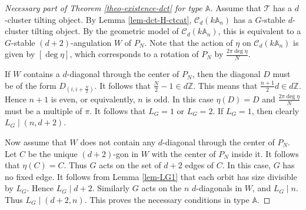 \documentclass[12pt]{article}
\theoremstyle{plain}
\theoremstyle{definition}
\newcommand{\T}{\mathcal{T}}
\begin{document}
 


\begin{proof}[Necessary part of Theorem \ref{theo-existence-dct} for type $\mathbb{A}$]
Assume that $\T$ has a $d$-cluster tilting object. By Lemma
\ref{lem-dct-H-ctcat}, $\mathcal{C}_d(k\mathbb{A}_n)$ has a $G$-stable
$d$-cluster tilting object. By the geometric model of
$\mathcal{C}_d(k\mathbb{A}_n)$, this is equivalent to a \(G\)-stable
\((d+2)\)-angulation \(W\) of \(P_N\). Note that the action of \(\eta\) on
\(\mathcal{C}_d(k\mathbb{A}_n)\) is given by \([\deg\eta]\), which corresponds
to a rotation of \(P_N\) by \(\frac{2\pi\deg\eta}{N}\).

If $W$ contains a $d$-diagonal through the center of $P_N$, then the diagonal $D$ must be of the form $D_{(i,i+\frac{N}{2})}$. It follows that 
\(\frac{N}{2}-1\in d\mathbb{Z}\). 
This means that 
\(\frac{n+1}{2}d\in d\mathbb{Z}\). 
Hence $n+1$ is even, or equivalently, $n$ is odd. In this case  $\eta(D)=D$ and $\frac{2\pi\deg\eta}{N}$ must be a multiple of $\pi$. It follows that $L_G=1$ or $L_G=2$.  If $L_G=1$, then clearly $L_G \mid (n,d+2)$. 

Now assume that \(W\) does not contain any \(d\)-diagonal through the center of
\(P_N\). Let \(C\) be the unique \((d+2)\)-gon in \(W\) with the center of
\(P_N\) inside it. It follows that \(\eta(C)=C\). Thus \(G\) acts on the set
of \(d+2\) edges of \(C\). In this case, \(G\) has no fixed edge. It follows
from Lemma \ref{lem-LG1} that each orbit has size divisible by \(L_G\). Hence
\(L_G\mid d+2\). Similarly \(G\) acts on the \(n\) \(d\)-diagonals in \(W\),
and \(L_G\mid n\). Thus \(L_G\mid(d+2,n)\). This proves the necessary
conditions in type \(\mathbb A\).
\end{proof}
\end{document}
